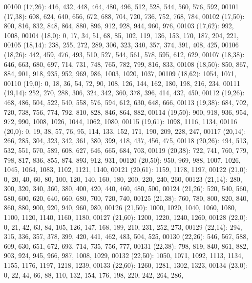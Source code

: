 \begin{DoxyCode}
00100       (17,26): 416, 432, 448, 464, 480, 496, 512, 528, 544, 560, 576, 592,
00101       (17,38): 608, 624, 640, 656, 672, 688, 704, 720, 736, 752, 768, 784,
00102       (17,50): 800, 816, 832, 848, 864, 880, 896, 912, 928, 944, 960, 976,
00103       (17,62): 992, 1008,
00104       (18,0): 0, 17, 34, 51, 68, 85, 102, 119, 136, 153, 170, 187, 204, 221,
00105       (18,14): 238, 255, 272, 289, 306, 323, 340, 357, 374, 391, 408, 425,
00106       (18,26): 442, 459, 476, 493, 510, 527, 544, 561, 578, 595, 612, 629,
00107       (18,38): 646, 663, 680, 697, 714, 731, 748, 765, 782, 799, 816, 833,
00108       (18,50): 850, 867, 884, 901, 918, 935, 952, 969, 986, 1003, 1020, 1037,
00109       (18,62): 1054, 1071,
00110       (19,0): 0, 18, 36, 54, 72, 90, 108, 126, 144, 162, 180, 198, 216, 234,
00111       (19,14): 252, 270, 288, 306, 324, 342, 360, 378, 396, 414, 432, 450,
00112       (19,26): 468, 486, 504, 522, 540, 558, 576, 594, 612, 630, 648, 666,
00113       (19,38): 684, 702, 720, 738, 756, 774, 792, 810, 828, 846, 864, 882,
00114       (19,50): 900, 918, 936, 954, 972, 990, 1008, 1026, 1044, 1062, 1080,
00115       (19,61): 1098, 1116, 1134,
00116       (20,0): 0, 19, 38, 57, 76, 95, 114, 133, 152, 171, 190, 209, 228, 247,
00117       (20,14): 266, 285, 304, 323, 342, 361, 380, 399, 418, 437, 456, 475,
00118       (20,26): 494, 513, 532, 551, 570, 589, 608, 627, 646, 665, 684, 703,
00119       (20,38): 722, 741, 760, 779, 798, 817, 836, 855, 874, 893, 912, 931,
00120       (20,50): 950, 969, 988, 1007, 1026, 1045, 1064, 1083, 1102, 1121, 1140,
00121       (20,61): 1159, 1178, 1197,
00122       (21,0): 0, 20, 40, 60, 80, 100, 120, 140, 160, 180, 200, 220, 240, 260,
00123       (21,14): 280, 300, 320, 340, 360, 380, 400, 420, 440, 460, 480, 500,
00124       (21,26): 520, 540, 560, 580, 600, 620, 640, 660, 680, 700, 720, 740,
00125       (21,38): 760, 780, 800, 820, 840, 860, 880, 900, 920, 940, 960, 980,
00126       (21,50): 1000, 1020, 1040, 1060, 1080, 1100, 1120, 1140, 1160, 1180,
00127       (21,60): 1200, 1220, 1240, 1260,
00128       (22,0): 0, 21, 42, 63, 84, 105, 126, 147, 168, 189, 210, 231, 252, 273,
00129       (22,14): 294, 315, 336, 357, 378, 399, 420, 441, 462, 483, 504, 525,
00130       (22,26): 546, 567, 588, 609, 630, 651, 672, 693, 714, 735, 756, 777,
00131       (22,38): 798, 819, 840, 861, 882, 903, 924, 945, 966, 987, 1008, 1029,
00132       (22,50): 1050, 1071, 1092, 1113, 1134, 1155, 1176, 1197, 1218, 1239,
00133       (22,60): 1260, 1281, 1302, 1323,
00134       (23,0): 0, 22, 44, 66, 88, 110, 132, 154, 176, 198, 220, 242, 264, 286,

\end{DoxyCode}
